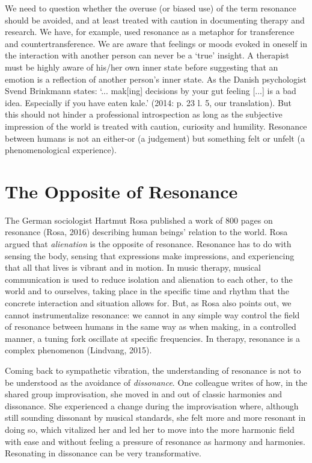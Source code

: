 \begin{adjmulticols}{2}{0mm}{0mm}
We need to question whether the overuse (or biased use) of the term resonance should be avoided, and at least treated with caution in documenting therapy and research. We have, for example, used resonance as a metaphor for transference and countertransference. We are aware that feelings or moods evoked in oneself in the interaction with another person can never be a ‘true’ insight. A therapist must be highly aware of his/her own inner state before suggesting that an emotion is a reflection of another person’s inner state. As the Danish psychologist Svend Brinkmann states: ‘... mak[ing] decisions by your gut feeling [...] is a bad idea. Especially if you have eaten kale.’ (2014: p. 23 l. 5, our translation). But this should not hinder a professional introspection as long as the subjective impression of the world is treated with caution, curiosity and humility. Resonance between humans is not an either-or (a judgement) but something felt or unfelt (a phenomenological experience).

\section{The Opposite of Resonance}
The German sociologist Hartmut Rosa published a work of 800 pages on resonance (Rosa, 2016) describing human beings’ relation to the world. Rosa argued that \textit{alienation} is the opposite of resonance. Resonance has to do with sensing the body, sensing that expressions make impressions, and experiencing that all that lives is vibrant and in motion. In music therapy, musical communication is used to reduce isolation and alienation to each other, to the world and to ourselves, taking place in the specific time and rhythm that the concrete interaction and situation allows for. But, as Rosa also points out, we cannot instrumentalize resonance: we cannot in any simple way control the field of resonance between humans in the same way as when making, in a controlled manner, a tuning fork oscillate at specific frequencies. In therapy, resonance is a complex phenomenon (Lindvang, 2015).

Coming back to sympathetic vibration, the understanding of resonance is not to be understood as the avoidance of \textit{dissonance}. One colleague writes of how, in the shared group improvisation, she moved in and out of classic harmonies and dissonance. She experienced a change during the improvisation where, although still sounding dissonant by musical standards, she felt more and more resonant in doing so, which vitalized her and led her to move into the more harmonic field with ease and without feeling a pressure of resonance as harmony and harmonies. Resonating in dissonance can be very transformative.


\end{adjmulticols}

